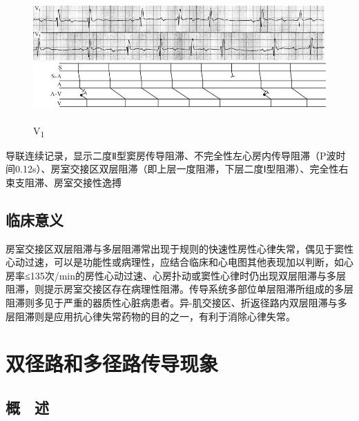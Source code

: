 \begin{figure}[!htbp]
 \centering
 \includegraphics[width=5.61458in,height=1.94792in]{./images/Image00411.jpg}
 \captionsetup{justification=centering}
 \caption{V\textsubscript{1}}
 \label{fig24-16}
  \end{figure} 
导联连续记录，显示二度Ⅱ型窦房传导阻滞、不完全性左心房内传导阻滞（P波时间0.12s）、房室交接区双层阻滞（即上层一度阻滞，下层二度Ⅰ型阻滞）、完全性右束支阻滞、房室交接性逸搏

\protect\hypertarget{text00031.htmlux5cux23subid373}{}{}

\section{临床意义}

房室交接区双层阻滞与多层阻滞常出现于规则的快速性房性心律失常，偶见于窦性心动过速，可以是功能性或病理性，应结合临床和心电图其他表现加以判断，如心房率≤135次/min的房性心动过速、心房扑动或窦性心律时仍出现双层阻滞与多层阻滞，则提示房室交接区存在病理性阻滞。传导系统多部位单层阻滞所组成的多层阻滞则多见于严重的器质性心脏病患者。异-肌交接区、折返径路内双层阻滞与多层阻滞则是应用抗心律失常药物的目的之一，有利于消除心律失常。

\protect\hypertarget{text00032.html}{}{}

\protect\hypertarget{text00032.htmlux5cux23chapter32}{}{}

\chapter{双径路和多径路传导现象}

\protect\hypertarget{text00032.htmlux5cux23subid374}{}{}

\section{概　述}

\protect\hypertarget{text00032.htmlux5cux23subid375}{}{}

